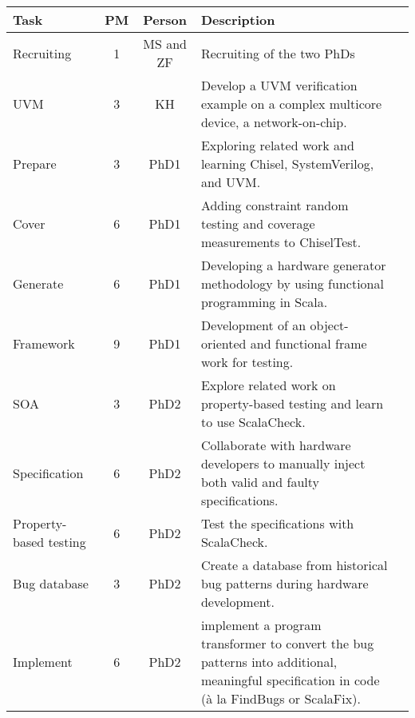 \documentclass[fleqn,12pt]{article}
\begin{document}
\begin{table*}%
{\small
  \begin{center}
    \begin{tabular}{lccp{110mm}l}
      \toprule
      Task                   & PM  & Person    & Description                                                                                   \\
      \midrule
      Recruiting             & 1   & MS and ZF & Recruiting of the two PhDs                                                                    \\
      \midrule
      UVM                    & 3   & KH        & Develop a UVM verification example on a complex multicore device, a network-on-chip.          \\
      Prepare                & 3   & PhD1      & Exploring related work and learning Chisel, SystemVerilog, and UVM.                           \\
      Cover                  & 6   & PhD1      & Adding constraint random testing and coverage measurements to ChiselTest.                     \\
      Generate               & 6   & PhD1      & Developing a hardware generator methodology by using functional programming in Scala.         \\
      Framework              & 9   & PhD1      & Development of an object-oriented and functional frame work for testing.                      \\
      \midrule
      SOA                    & 3   & PhD2      & Explore related work on property-based testing and learn to use ScalaCheck.                   \\
      Specification          & 6   & PhD2      & Collaborate with hardware developers to manually inject both valid and faulty specifications. \\
      Property-based testing & 6   & PhD2      & Test the specifications with ScalaCheck.                                                      \\
      Bug database           & 3   & PhD2      & Create a database from historical bug patterns during hardware development.                   \\
      Implement              & 6   & PhD2      & implement a program transformer to convert the bug patterns into %
  additional, meaningful  specification in code (\`a la FindBugs or ScalaFix).                                                                 \\

\end{tabular}
\end{center}}
\end{table*}
\end{document}
